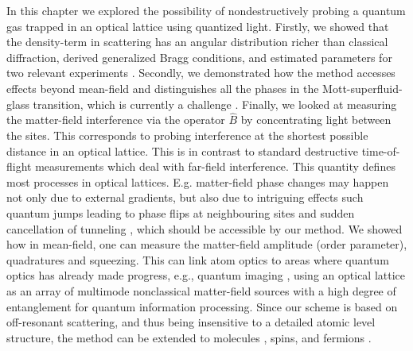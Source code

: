 In this chapter we explored the possibility of nondestructively
probing a quantum gas trapped in an optical lattice using quantized
light. Firstly, we showed that the density-term in scattering has an
angular distribution richer than classical diffraction, derived
generalized Bragg conditions, and estimated parameters for two
relevant experiments \cite{weitenberg2011, miyake2011}. Secondly, we
demonstrated how the method accesses effects beyond mean-field and
distinguishes all the phases in the Mott-superfluid-glass transition,
which is currently a challenge \cite{derrico2014}. Finally, we looked
at measuring the matter-field interference via the operator $\hat{B}$
by concentrating light between the sites. This corresponds to probing
interference at the shortest possible distance in an optical
lattice. This is in contrast to standard destructive time-of-flight
measurements which deal with far-field interference. This quantity
defines most processes in optical lattices. E.g. matter-field phase
changes may happen not only due to external gradients, but also due to
intriguing effects such quantum jumps leading to phase flips at
neighbouring sites and sudden cancellation of tunneling
\cite{vukics2007}, which should be accessible by our method. We showed
how in mean-field, one can measure the matter-field amplitude (order
parameter), quadratures and squeezing. This can link atom optics to
areas where quantum optics has already made progress, e.g., quantum
imaging \cite{golubev2010, kolobov1999}, using an optical lattice as
an array of multimode nonclassical matter-field sources with a high
degree of entanglement for quantum information processing. Since our
scheme is based on off-resonant scattering, and thus being insensitive
to a detailed atomic level structure, the method can be extended to
molecules \cite{LP2013}, spins, and fermions \cite{ruostekoski2009}.

